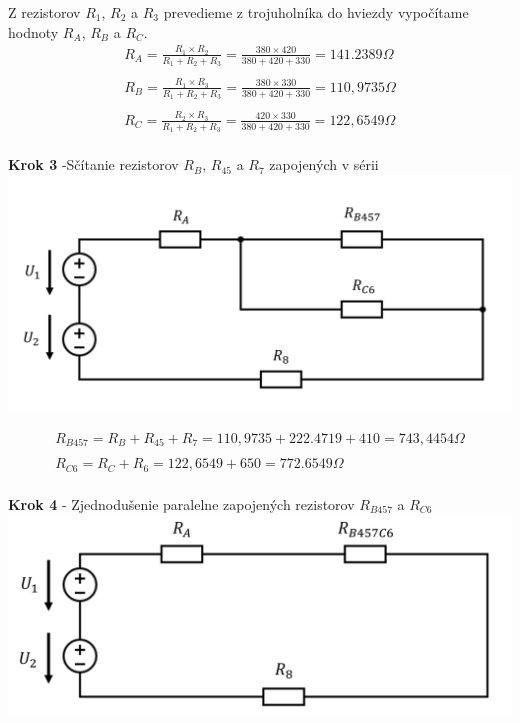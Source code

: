 \noindent Z rezistorov $R_1$, $R_2$ a $R_3$ prevedieme z trojuholníka do hviezdy vypočítame hodnoty $R_A$, $R_B$ a $R_C$.\\

\begin{gather*}
R_A = \frac{R_1 \times R_2}{R_1 + R_2 + R_3} =
\frac{380 \times 420}{380 + 420 + 330}=
141.2389 \Omega \\\\
R_B = \frac{R_1 \times R_3}{R_1 + R_2 + R_3} =
\frac{380 \times 330}{380 + 420 + 330} =
110,9735 \Omega \\\\
R_C = \frac{R_2 \times R_3}{R_1 + R_2 + R_3} =
\frac{420 \times 330}{380 + 420 + 330} =
122,6549 \Omega \\\
\end{gather*}

\begin{center}
\textbf{Krok 3} -Sčítanie rezistorov $R_B$, $R_{45}$ a $R_7$ zapojených v sérii
\includegraphics[scale=0.5,keepaspectratio]{fig/c3.png} \\
\end{center}

\begin{gather*}
R_{B457} = R_B + R_45 + R_7 =
110,9735 + 222.4719 + 410 =
743,4454 \Omega
\\\\
R_{C6} = R_C + R_6 =
122,6549 + 650 =
772.6549 \Omega
\\\
\end{gather*}
 
\newpage

\begin{center}
\textbf{Krok 4} - Zjednodušenie paralelne zapojených rezistorov $R_{B457}$ a $R_{C6}$ \\
\includegraphics[scale=0.5,keepaspectratio]{fig/c4.png} \\
\end{center}


